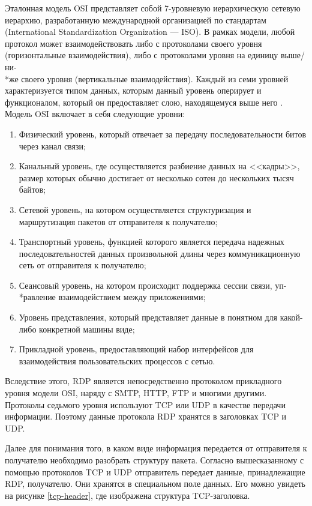 \documentclass[bachelor, och, coursework]{SCWorks}
\begin{document}
    Эталонная модель OSI представляет собой 7-уровневую иерархическую сетевую иерархию, разработанную международной организацией по стандартам
    (International Standardization Organization --- ISO). В рамках модели, любой протокол может взаимодействовать либо с протоколами своего
    уровня (горизонтальные взаимодействия), либо с протоколами уровня на единицу выше/ни-\\*же своего уровня (вертикальные взаимодействия).
    Каждый из семи уровней характеризуется типом данных, которым данный уровень оперирует и функционалом, который он предоставляет слою,
    находящемуся выше него \cite{osi-model}. Модель OSI включает в себя следующие уровни:

    \begin{enumerate}
      \item Физический уровень, который отвечает за передачу последовательности битов через канал связи;
      \item Канальный уровень, где осуществляется разбиение данных на <<кадры>>, размер которых обычно достигает
      от несколько сотен до нескольких тысяч байтов;
      \item Сетевой уровень, на котором осуществляется структуризация и маршрутизация пакетов от отправителя к получателю;
      \item Транспортный уровень, функцией которого является передача надежных последовательностей данных произвольной
      длины через коммуникационную сеть от отправителя к получателю;
      \item Сеансовый уровень, на котором происходит поддержка сессии связи, уп-\\*равление взаимодействием между приложениями;  
      \item Уровень представления, который представляет данные в понятном для какой-либо конкретной машины виде;
      \item Прикладной уровень, предоставляющий набор интерфейсов для взаимодействия пользовательских процессов с сетью.
    \end{enumerate}

    Вследствие этого, RDP является непосредственно протоколом прикладного уровня модели OSI, наряду с SMTP, HTTP, FTP и многими другими. 
    Протоколы седьмого уровня используют TCP или UDP в качестве передачи информации. Поэтому данные протокола RDP хранятся в заголовках TCP и
    UDP. 
    
    Далее для понимания того, в каком виде информация передается от отправителя к получателю необходимо разобрать структуру пакета.
    Согласно вышесказанному с помощью протоколов TCP и UDP отправитель передает данные, принадлежащие RDP, получателю. Они хранятся в специальном поле данных.
    Его можно увидеть на рисунке \ref{tcp-header}, где изображена структура TCP-заголовка.
    
\end{document}
